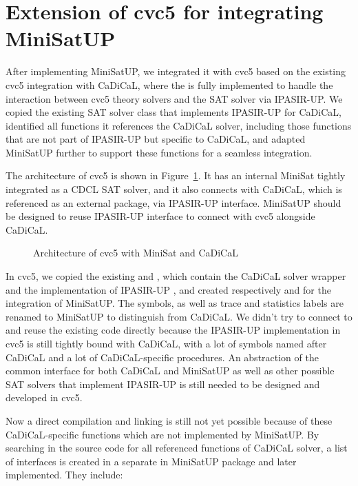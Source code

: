 \section{Extension of cvc5 for integrating MiniSatUP}

After implementing MiniSatUP, we integrated it with cvc5 based on the existing cvc5 integration with CaDiCaL, where the  is fully implemented to handle the interaction between cvc5 theory solvers and the SAT solver via IPASIR-UP. We copied the existing SAT solver class that implements IPASIR-UP for CaDiCaL, identified all functions it references the CaDiCaL solver, including those functions that are not part of IPASIR-UP but specific to CaDiCaL, and adapted MiniSatUP further to support these functions for a seamless integration.

The architecture of cvc5 is shown in Figure~\ref{fig:cvc5}. It has an internal MiniSat tightly integrated as a CDCL SAT solver, and it also connects with CaDiCaL, which is referenced as an external package, via IPASIR-UP interface. MiniSatUP should be designed to reuse IPASIR-UP interface to connect with cvc5 alongside CaDiCaL.

\begin{figure}[!htbp]
  \centering
  
  \caption{Architecture of cvc5 with MiniSat and CaDiCaL}
  \label{fig:cvc5}
\end{figure}

In cvc5, we copied the existing  and , which contain the CaDiCaL solver wrapper and the implementation of IPASIR-UP , and created respectively  and  for the integration of MiniSatUP. The symbols, as well as trace and statistics labels are renamed to MiniSatUP to distinguish from CaDiCaL. We didn't try to connect to and reuse the existing code directly because the IPASIR-UP implementation in cvc5 is still tightly bound with CaDiCaL, with a lot of symbols named after CaDiCaL and a lot of CaDiCaL-specific procedures. An abstraction of the common interface for both CaDiCaL and MiniSatUP as well as other possible SAT solvers that implement IPASIR-UP is still needed to be designed and developed in cvc5.

Now a direct compilation and linking is still not yet possible because of these CaDiCaL-specific functions which are not implemented by MiniSatUP. By searching in the source code for all referenced functions of CaDiCaL solver, a list of interfaces is created in a separate  in MiniSatUP package and later implemented. They include:

